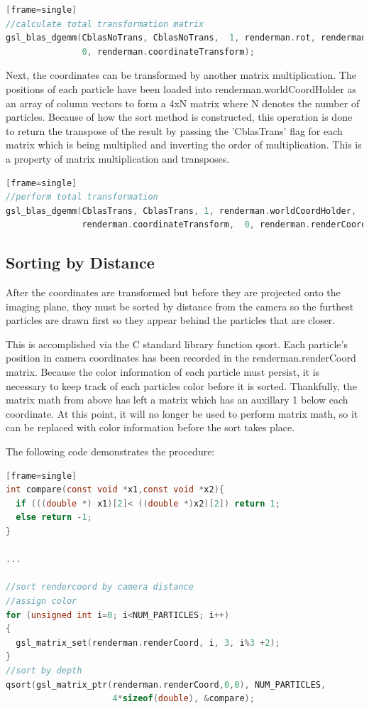\documentclass{article}
\begin{document}
\begin{lstlisting}[language=c][frame=single]
//calculate total transformation matrix
gsl_blas_dgemm(CblasNoTrans, CblasNoTrans,  1, renderman.rot, renderman.trans,
               0, renderman.coordinateTransform);
\end{lstlisting}

Next, the coordinates can be transformed by another matrix multiplication. The positions of each particle have
been loaded into renderman.worldCoordHolder as an array of column vectors to form a 4xN matrix where N denotes the number of particles. Because
of how the sort method is constructed, this operation is done to return the transpose of the result by passing 
the 'CblasTrans' flag for each matrix which is being multiplied and inverting the order of multiplication. This
is a property of matrix multiplication and transposes.

\begin{lstlisting}[language=c][frame=single]
//perform total transformation
gsl_blas_dgemm(CblasTrans, CblasTrans, 1, renderman.worldCoordHolder, 
               renderman.coordinateTransform,  0, renderman.renderCoord);
\end{lstlisting}

\subsection{Sorting by Distance}
After the coordinates are transformed but before they are projected onto the imaging plane, they must be sorted by
distance from the camera so the furthest particles are drawn first so they appear behind the particles that are closer.

This is accomplished via the C standard library function qsort. Each particle's position in camera coordinates 
has been recorded in the renderman.renderCoord matrix. Because the color information of each particle must persist, it is 
necessary to keep track of each particles color before it is sorted. Thankfully, the matrix math from above 
has left a matrix which has an auxillary 1 below each coordinate. At this point, it will no longer be used
to perform matrix math, so it can be replaced with color information before the sort takes place.

The following code demonstrates the procedure:

\begin{lstlisting}[language=c][frame=single]
int compare(const void *x1,const void *x2){
  if (((double *) x1)[2]< ((double *)x2)[2]) return 1;
  else return -1;
}

...

//sort rendercoord by camera distance
//assign color
for (unsigned int i=0; i<NUM_PARTICLES; i++)
{
  gsl_matrix_set(renderman.renderCoord, i, 3, i%3 +2);
}
//sort by depth
qsort(gsl_matrix_ptr(renderman.renderCoord,0,0), NUM_PARTICLES, 
                     4*sizeof(double), &compare);
\end{lstlisting}
\end{document}
